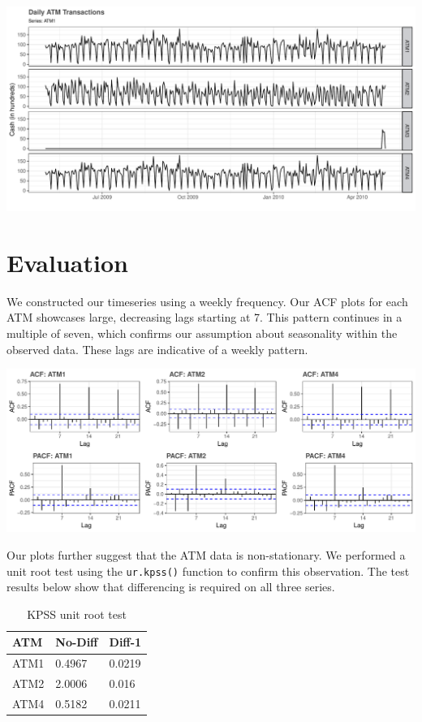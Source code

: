 \documentclass[openany]{book}
\begin{document}
\includegraphics{Part-A-JM_files/figure-latex/unnamed-chunk-3-1.pdf}

\hypertarget{evaluation}{%
\section{Evaluation}\label{evaluation}}

We constructed our timeseries using a weekly frequency. Our ACF plots
for each ATM showcases large, decreasing lags starting at 7. This
pattern continues in a multiple of seven, which confirms our assumption
about seasonality within the observed data. These lags are indicative of
a weekly pattern.

\includegraphics{Part-A-JM_files/figure-latex/unnamed-chunk-4-1.pdf}

Our plots further suggest that the ATM data is non-stationary. We
performed a unit root test using the \texttt{ur.kpss()} function to
confirm this observation. The test results below show that differencing
is required on all three series.

\begin{table}[H]

\caption{\label{tab:unnamed-chunk-5}KPSS unit root test}
\centering
\begin{tabular}{l|l|l}
\hline
\textbf{ATM} & \textbf{No-Diff} & \textbf{Diff-1}\\
\hline
\rowcolor{gray!6}  ATM1 & 0.4967 & 0.0219\\
\hline
ATM2 & 2.0006 & 0.016\\
\hline
\rowcolor{gray!6}  ATM4 & 0.5182 & 0.0211\\
\hline
\end{tabular}
\end{table}
\end{document}
